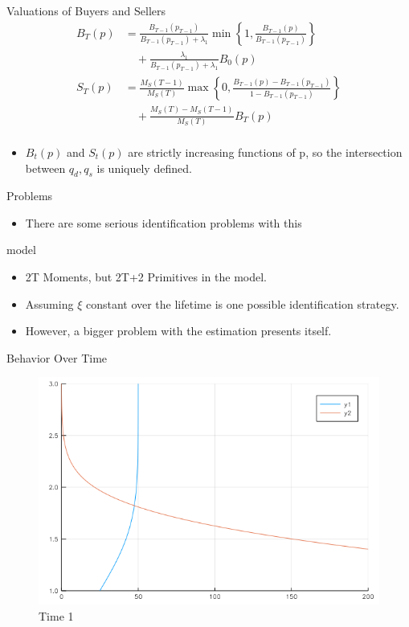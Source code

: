 \documentclass[bigger]{beamer}
\begin{document}
\begin{frame}[label=sec-1-28]{Valuations of Buyers and Sellers}
\begin{align*}
B_T (p) &= \frac{ B_{T-1 }(p_{T-1}) }{ B_{T-1 }(p_{T-1}) + \lambda_1 } \min \left \{ 1, \frac{ B_{T-1} ( p ) }{B_{T-1 }(p_{T-1 })} \right \}\\
 & \quad + \frac{ \lambda_1 }{ B_{T-1 }(p_{T-1}) + \lambda_1 } B_0 (p) \\
S_T (p) &= \frac{ M_S(T-1) }{ M_S(T) } \max \left \{ 0, \frac{ B_{T-1}(p) - B_{T-1}( p_{T-1} ) }{ 1 - B_{T-1} ( p_{T-1} ) } \right \}\\
 & \quad + \frac{ M_S(T) - M_S(T-1)_{} }{M_S(T)} B_T (p)\\
\end{align*}


\begin{itemize}
\item $B_t(p)$ and $S_t(p)$ are strictly increasing functions of p, so the
intersection between $q_d, q_s$ is uniquely defined.
\end{itemize}
\end{frame}
\begin{frame}[label=sec-1-29]{Problems}
\begin{itemize}
\item There are some serious identification problems with this
\end{itemize}
model
\begin{itemize}
\item 2T Moments, but 2T+2 Primitives in the model.
\item Assuming $\xi$ constant over the lifetime is one possible identification
strategy.
\item However, a bigger problem with the estimation presents itself.
\end{itemize}
\end{frame}

\begin{frame}[label=sec-1-30]{Behavior Over Time}
\begin{figure}[htb]
\centering
\includegraphics[width=.9\linewidth]{../Plots/gif/000001.png}
\caption{Time 1}
\end{figure}
\end{frame}
\end{document}
